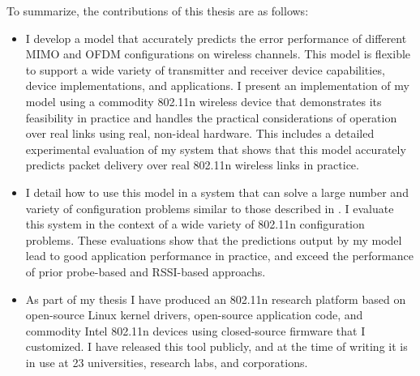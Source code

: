 To summarize, the contributions of this thesis are as follows:
\begin{itemize}[leftmargin=0.5cm,parsep=1ex,itemsep=1ex,topsep=1ex]
\item I develop a model that accurately predicts the error performance of different MIMO and OFDM configurations on wireless channels. This model is flexible to support a wide variety of transmitter and receiver device capabilities, device implementations, and applications. I present an implementation of my model using a commodity 802.11n wireless device that demonstrates its feasibility in practice and handles the practical considerations of operation over real links using real, non-ideal hardware. This includes a detailed experimental evaluation of my system that shows that this model accurately predicts packet delivery over real 802.11n wireless links in practice.

\item I detail how to use this model in a system that can solve a large number and variety of configuration problems similar to those described in . I evaluate this system in the context of a wide variety of 802.11n configuration problems.
These evaluations show that the predictions output by my model lead to good application performance in practice, and exceed the performance of prior probe-based and RSSI-based approachs.

\item As part of my thesis I have produced an 802.11n research platform based on open-source Linux kernel drivers, open-source application code, and commodity Intel 802.11n devices using closed-source firmware that I customized.
I have released this tool publicly, and at the time of writing it is in use at 23 universities, research labs, and corporations.
\end{itemize}


